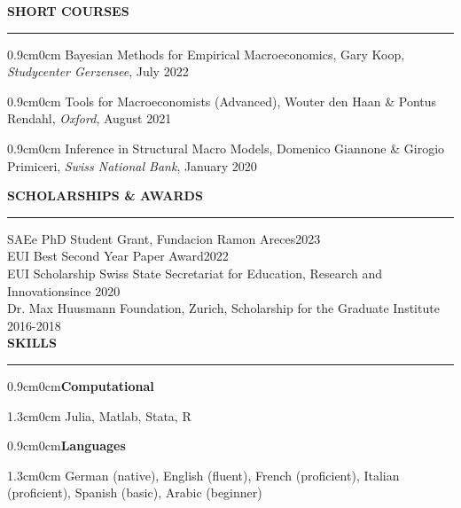 \documentclass[letterpaper,11pt]{article}
\begin{document}
\vspace{0.5cm}
\textbf{SHORT COURSES} \\
\vspace{1mm} \hrule
\vspace{1mm}
\begin{adjustwidth}{0.9cm}{0cm} Bayesian Methods for Empirical Macroeconomics, Gary Koop, \textit{Studycenter Gerzensee}, July 2022\end{adjustwidth}
\begin{adjustwidth}{0.9cm}{0cm} Tools for Macroeconomists (Advanced), Wouter den Haan \& Pontus Rendahl, \textit{Oxford}, August 2021\end{adjustwidth}
\begin{adjustwidth}{0.9cm}{0cm} Inference in Structural Macro Models, Domenico Giannone \& Girogio Primiceri, \textit{Swiss National Bank}, January 2020\end{adjustwidth}



\vspace{0.5cm}
\textbf{SCHOLARSHIPS \& AWARDS}\\
\vspace{1mm} \hrule
\vspace{2mm}
\hspace{0.9cm} SAEe PhD Student Grant, Fundacion Ramon Areces\hfill 2023\\
\vspace{1mm}
\hspace{0.9cm} EUI Best Second Year Paper Award\hfill 2022\\
\vspace{1mm}
\hspace{0.9cm} EUI Scholarship Swiss State Secretariat for Education, Research and Innovation\hfill since 2020\\
\vspace{1mm}
\hspace{0.9cm} Dr. Max Huusmann Foundation, Zurich, Scholarship for the Graduate Institute \hfill 2016-2018\\

\vspace{0.5cm}
\textbf{SKILLS}\\
\vspace{1mm} \hrule
\vspace{1mm}
\begin{adjustwidth}{0.9cm}{0cm}\textbf{Computational}\end{adjustwidth}
\begin{adjustwidth}{1.3cm}{0cm} Julia, Matlab, Stata, R \end{adjustwidth}
\vspace{0.2cm}
\begin{adjustwidth}{0.9cm}{0cm}\textbf{Languages}\end{adjustwidth} 
\begin{adjustwidth}{1.3cm}{0cm} German (native), English (fluent), French (proficient), Italian (proficient), Spanish (basic), Arabic (beginner)\end{adjustwidth}
\end{document}
